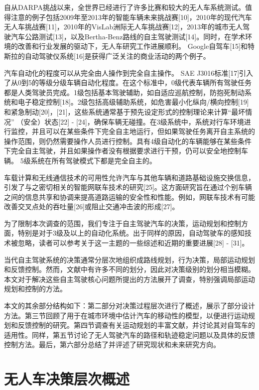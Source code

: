 自从DARPA挑战以来，全世界已经进行了许多比赛和较大的无人车系统测试。值得注意的例子包括2009年至2013年的智能车辆未来挑战赛[10]，2010年的现代汽车无人车挑战赛[11]，2010年的VisLab洲际无人车挑战赛[12]，2013年的城市无人驾驶汽车公路测试[13]，以及Bertha-Benz路线的自主驾驶测试[14]。同时，在学术环境的改善和行业发展的驱动下，无人车研究工作进展顺利。 Google自驾车[15]和特斯拉的自动驾驶仪系统[16]是获得广泛关注的商业活动的两个例子。

汽车自动化的程度可以从完全由人操作到完全自主操作。 SAE J3016标准[17]引入了从0到5的等级分级车辆自动化程度。在这个标准中，0级代表车辆所有驾驶任务都是人类驾驶员完成。1级包括基本驾驶辅助，如自适应巡航控制，防抱死制动系统和电子稳定控制[18]。2级包括高级辅助系统，如危害最小化纵向/横向控制[19]和紧急制动[20]，[21]，这些系统通常基于预先设定形式的控制理论来计算“最坏情况” （安全）状态[22] - [24]，确保车辆无碰撞。在3级系统中，系统对行车环境进行监控，并且可以在某些条件下完全自主地运行，但如果驾驶任务离开自主系统的操作范围，则仍然需要操作人员进行控制。具有4级自动化的车辆能够在某些条件下完全自主驾驶，并且如果操作者没有根据要求进行干预，仍可以安全地控制车辆。 5级系统在所有驾驶模式下都是完全自主的。

车载计算和无线通信技术的可用性允许汽车与其他车辆和道路基础设施交换信息，引发了与之密切相关的智能网联车技术的研究[25]。这方面研究旨在通过个别车辆之间的信息共享和协调来提高道路运输的安全性和性能。例如，网联车技术有可能改善交叉点处的吞吐量[26]或阻止交通冲击波的形成[27]。

为了限制本次调查的范围，我们专注于自主驾驶汽车的决策，运动规划和控制方面，特别是对于3级及以上的自动化系统。出于同样的原因，自动驾驶车的感知技术被忽略，读者可以参考关于这一主题的一些综述和近期的重要进展[28] - [31]。

当代自主驾驶系统的决策通常分层次地组织成路线规划，行为决策，局部运动规划和反馈控制。然而，文献中有许多不同的划分，因此对决策级别的划分相当模糊。本文对于解决这些自主驾驶核心问题所提出的方法展开了调查，特别强调局部运动规划和控制的方法。

本文的其余部分结构如下：第二部分对决策过程层次进行了概述，展示了部分设计方法。第三节回顾了用于在城市环境中估计汽车的移动性的模型，以便进行运动规划和反馈控制的研究。第四节调查有关运动规划的丰富文献，并讨论其对自驾车的适用性。同样，第五节讨论了无人驾驶汽车的路径和轨迹稳定问题以及具体的反馈控制方法。最后，第六部分总结了并评述了研究现状和未来研究方向。


\section{无人车决策层次概述}

